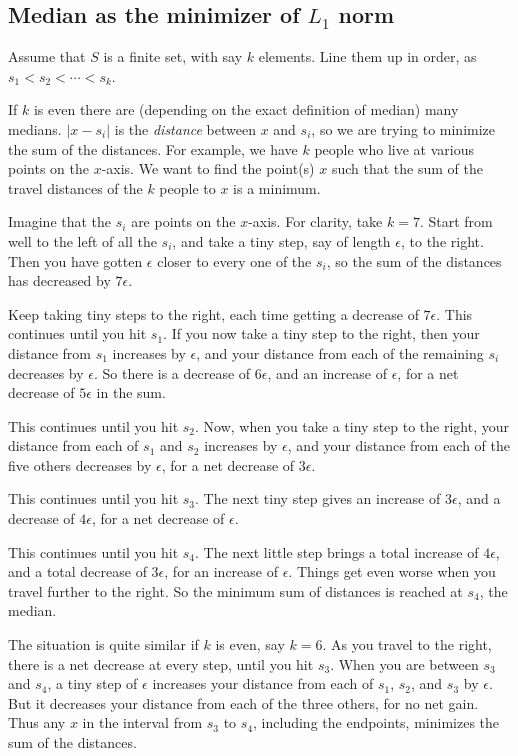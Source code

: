 \subsection{Median as the minimizer of $L_1$ norm}
\label{medianMin}
Assume that $S$ is a finite set, with say $k$ elements. Line them up in order, as $s_1<s_2<\cdots <s_k$.  

If $k$ is even there are (depending on the exact definition of median) many medians. $|x-s_i|$ is the \textit{distance} between $x$ and $s_i$, so we are trying to minimize the sum of the distances. For example, we have $k$ people who live at various points on the $x$-axis. We want to find the point(s) $x$ such that the sum of the travel distances of the $k$ people to $x$ is a minimum.

Imagine that the $s_i$ are points on the $x$-axis. For clarity, take $k=7$. Start from well to the left of all the $s_i$, and take a tiny step, say of length $\epsilon$, to the right. Then you have gotten $\epsilon$ closer to every one of the $s_i$, so the sum of the distances has decreased by $7\epsilon$. 

Keep taking tiny steps to the right, each time getting a decrease of $7\epsilon$. This continues until you hit $s_1$. If you now take a tiny step to the right, then your distance from $s_1$ increases by $\epsilon$, and your distance from each of the remaining $s_i$  decreases by $\epsilon$. So there is a decrease of $6\epsilon$, and an increase of $\epsilon$, for a net decrease of $5\epsilon$ in the sum. 

This continues until you hit $s_2$. Now, when you take a tiny step to the right, your distance from each of $s_1$ and $s_2$ increases by $\epsilon$, and your distance from each of the five others decreases by $\epsilon$, for a net decrease of $3\epsilon$.

This continues until you hit $s_3$. The next tiny step gives an increase of $3\epsilon$, and a decrease of $4\epsilon$, for a net decrease of $\epsilon$.

This continues until you hit $s_4$. The next little step brings a total increase of $4\epsilon$, and a total decrease of $3\epsilon$, for an increase of $\epsilon$. Things get even worse when you travel further to the right. So the minimum sum of distances is reached at $s_4$, the median.

The situation is quite similar if $k$ is even, say $k=6$. As you travel to the right, there is a net decrease at every step, until you hit $s_3$. When you are between $s_3$ and $s_4$, a tiny step of $\epsilon$ increases your distance from each of $s_1$, $s_2$, and $s_3$ by $\epsilon$. But it decreases your distance from each of the three others, for no net gain. Thus any $x$ in the interval from  $s_3$ to $s_4$, including the endpoints, minimizes the sum of the distances. 

